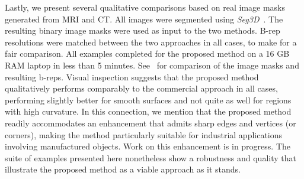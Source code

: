 \noindent Lastly, we present several qualitative comparisons based on real image masks generated from MRI and CT.  All images were segmented using \textit{Seg3D}~\cite{Seg3D}. The resulting binary image masks were used as input to the two methods. B-rep resolutions were matched between the two approaches in all cases, to make for a fair comparison. All examples completed for the proposed method on a 16 GB RAM laptop in less than 5 minutes. See~ for comparison of the image masks and resulting b-reps. Visual inspection suggests that the proposed method qualitatively performs comparably to the commercial approach in all cases, performing slightly better for smooth surfaces and not quite as well for regions with high curvature.  In this connection, we mention that the proposed method readily accommodates an enhancement that admits sharp edges and vertices (or corners), making the method particularly suitable for industrial applications involving manufactured objects.  Work on this enhancement is in progress.  The suite of examples presented here nonetheless show a robustness and quality that illustrate the proposed method as a viable approach as it stands.
